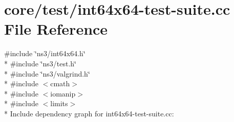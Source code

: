 \hypertarget{int64x64-test-suite_8cc}{}\section{core/test/int64x64-\/test-\/suite.cc File Reference}
\label{int64x64-test-suite_8cc}
{\ttfamily \#include \char`\"{}ns3/int64x64.\+h\char`\"{}}\\*
{\ttfamily \#include \char`\"{}ns3/test.\+h\char`\"{}}\\*
{\ttfamily \#include \char`\"{}ns3/valgrind.\+h\char`\"{}}\\*
{\ttfamily \#include $<$cmath$>$}\\*
{\ttfamily \#include $<$iomanip$>$}\\*
{\ttfamily \#include $<$limits$>$}\\*
Include dependency graph for int64x64-\/test-\/suite.cc\+:
